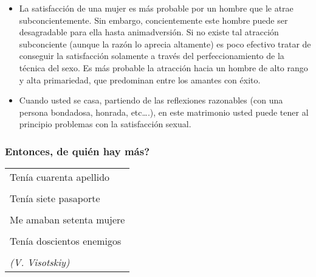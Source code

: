 \begin{itemize}
\tightlist
\item
  La satisfacción de una mujer es más probable por un hombre que le
  atrae subconcientemente. Sin embargo, concientemente este hombre puede
  ser desagradable para ella hasta animadversión. Si no existe tal
  atracción subconciente (aunque la razón lo aprecia altamente) es poco
  efectivo tratar de conseguir la satisfacción solamente a través del
  perfeccionamiento de la técnica del sexo. Es más probable la atracción
  hacia un hombre de alto rango y alta primariedad, que predominan entre
  los amantes con éxito.
\item
  Cuando usted se casa, partiendo de las reflexiones razonables (con una
  persona bondadosa, honrada, etc\ldots{}.), en este matrimonio usted
  puede tener al principio problemas con la satisfacción sexual.
\end{itemize}

\protect\hypertarget{M15}{}{}

\subsubsection{Entonces, de quién hay
más?}\label{entonces-de-quiuxe9n-hay-muxe1s}

\begin{longtable}[]{@{}l@{}}
\toprule
Tenía cuarenta apellido\tabularnewline
\tabularnewline
Tenía siete pasaporte\tabularnewline
\tabularnewline
Me amaban setenta mujere\tabularnewline
\tabularnewline
Tenía doscientos enemigos\tabularnewline
\tabularnewline
\emph{(V. Visotskiy)}\tabularnewline
\bottomrule
\end{longtable}

